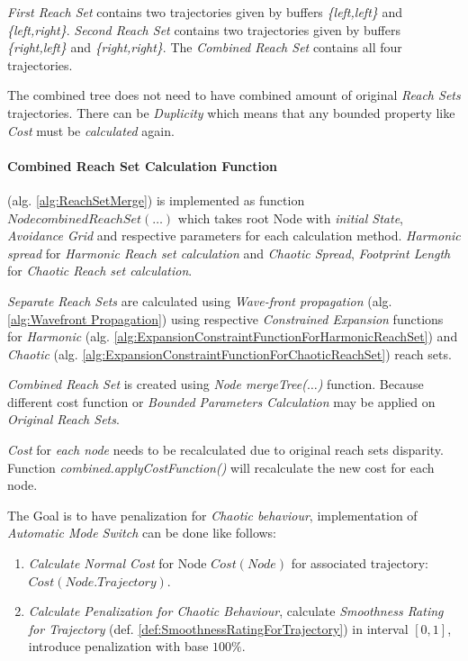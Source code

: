 \emph{First Reach Set} contains two trajectories given by buffers \emph{\{left,left\}} and \emph{\{left,right\}}. \emph{Second Reach Set} contains two trajectories given by buffers \emph{\{right,left\}} and \emph{\{right,right\}}. The \emph{Combined Reach Set} contains all four trajectories.

\begin{note}
    The combined tree \cite{o1996log} does not need to have combined amount of original \emph{Reach Sets} trajectories. There can be \emph{Duplicity} which means that any bounded property like \emph{Cost} must be \emph{calculated} again.
\end{note}

\paragraph{Combined Reach Set Calculation Function} (alg. \ref{alg:ReachSetMerge}) is implemented as function $Node combinedReachSet(\dots)$ which takes root Node with \emph{initial State}, \emph{Avoidance Grid} and respective parameters for each calculation method. \emph{Harmonic spread} for \emph{Harmonic Reach set calculation} and \emph{Chaotic Spread}, \emph{Footprint Length} for \emph{Chaotic Reach set calculation}.

\emph{Separate Reach Sets} are calculated using \emph{Wave-front propagation} (alg. \ref{alg:Wavefront Propagation}) using respective \emph{Constrained Expansion} functions for \emph{Harmonic} (alg. \ref{alg:ExpansionConstraintFunctionForHarmonicReachSet}) and \emph{Chaotic} (alg. \ref{alg:ExpansionConstraintFunctionForChaoticReachSet}) reach sets.

\emph{Combined Reach Set} is created using \emph{Node mergeTree($\dots$)} function. Because different cost function or \emph{Bounded Parameters Calculation} may be applied on \emph{Original Reach Sets}.

\emph{Cost} for \emph{each node} needs to be recalculated due to original reach sets disparity. Function \emph{combined.applyCostFunction()} will recalculate the new cost for each node. 

The Goal is to have penalization for \emph{Chaotic behaviour}, implementation of \emph{Automatic Mode Switch} can be done like follows:
\begin{enumerate}
    \item \emph{Calculate Normal Cost} for Node $Cost(Node)$ for associated trajectory:\\ $Cost(Node.Trajectory)$.
    \item \emph{Calculate Penalization for \emph{Chaotic Behaviour}}, calculate \emph{Smoothness Rating for Trajectory} (def. \ref{def:SmoothnessRatingForTrajectory}) in interval $[0,1]$, introduce penalization with base $100 \%$.
\end{enumerate}

